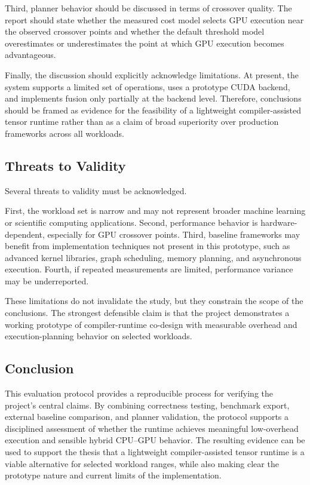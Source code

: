 \documentclass[12pt]{article}
\begin{document}
Third, planner behavior should be discussed in terms of crossover quality. The report should state whether the measured cost model selects GPU execution near the observed crossover points and whether the default threshold model overestimates or underestimates the point at which GPU execution becomes advantageous.

Finally, the discussion should explicitly acknowledge limitations. At present, the system supports a limited set of operations, uses a prototype CUDA backend, and implements fusion only partially at the backend level. Therefore, conclusions should be framed as evidence for the feasibility of a lightweight compiler-assisted tensor runtime rather than as a claim of broad superiority over production frameworks across all workloads.

\subsection{Threats to Validity}

Several threats to validity must be acknowledged.

First, the workload set is narrow and may not represent broader machine learning or scientific computing applications. Second, performance behavior is hardware-dependent, especially for GPU crossover points. Third, baseline frameworks may benefit from implementation techniques not present in this prototype, such as advanced kernel libraries, graph scheduling, memory planning, and asynchronous execution. Fourth, if repeated measurements are limited, performance variance may be underreported.

These limitations do not invalidate the study, but they constrain the scope of the conclusions. The strongest defensible claim is that the project demonstrates a working prototype of compiler-runtime co-design with measurable overhead and execution-planning behavior on selected workloads.

\subsection{Conclusion}

This evaluation protocol provides a reproducible process for verifying the project's central claims. By combining correctness testing, benchmark export, external baseline comparison, and planner validation, the protocol supports a disciplined assessment of whether the runtime achieves meaningful low-overhead execution and sensible hybrid CPU--GPU behavior. The resulting evidence can be used to support the thesis that a lightweight compiler-assisted tensor runtime is a viable alternative for selected workload ranges, while also making clear the prototype nature and current limits of the implementation.
\end{document}

